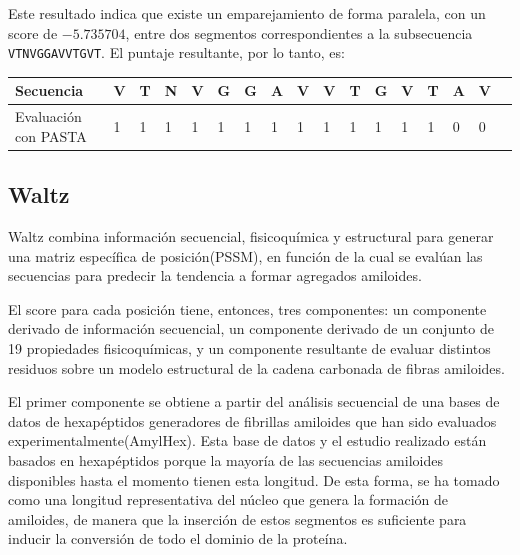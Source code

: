 Este resultado indica que existe un emparejamiento de forma paralela, con un score de $-5.735704$, entre dos segmentos correspondientes a la subsecuencia \texttt{VTNVGGAVVTGVT}. 
El puntaje resultante, por lo tanto, es:

\begin{center}
\begin{tabular}{lllllllllllllllll} 
\hline    
Secuencia & \textbf{V} & \textbf{T} & \textbf{N} & \textbf{V} & \textbf{G} & \textbf{G} & \textbf{A} & \textbf{V} & \textbf{V} &\textbf{T} & \textbf{G} & \textbf{V} & \textbf{T} & \textbf{A} & \textbf{V} \\ \hline
Evaluación con PASTA & 1 & 1 & 1 & 1 & 1 & 1 & 1 & 1 & 1 & 1 & 1 & 1 & 1 & 0 & 0 \\ \hline
\end{tabular}
\end{center}





\subsection{Waltz}\label{waltz}

Waltz \cite{maurer2010exploring} combina información secuencial, fisicoquímica y estructural para generar una matriz específica de posición(PSSM),
en función de la cual se evalúan las secuencias para predecir la tendencia a formar agregados amiloides.



El score para cada posición tiene, entonces, tres componentes: un componente derivado de información secuencial, un componente derivado de un conjunto de 19 propiedades fisicoquímicas, 
y un componente resultante de evaluar distintos residuos sobre un modelo estructural de la cadena carbonada de fibras amiloides.

El primer componente se obtiene a partir del análisis secuencial de una bases de datos de hexapéptidos generadores de fibrillas amiloides que han sido evaluados experimentalmente(AmylHex).
Esta base de datos y el estudio realizado están basados en hexapéptidos porque la mayoría de las secuencias amiloides disponibles hasta el momento tienen esta longitud.
De esta forma, se ha tomado como una longitud representativa del núcleo que genera la formación de amiloides, de manera que
la inserción de estos segmentos es suficiente para inducir la conversión de todo el dominio de la proteína. 

